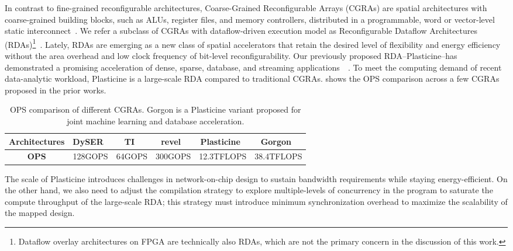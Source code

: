 In contrast to fine-grained reconfigurable architectures,
Coarse-Grained Reconfigurable Arrays (CGRAs) are spatial architectures with 
coarse-grained building blocks, such as ALUs, register files, and memory controllers, 
distributed in a programmable, word or vector-level static interconnect~\cite{adres, kress, dyser, piperench, tartan, 
hrl, hycube}.
We refer a subclass of CGRAs with dataflow-driven execution model as Reconfigurable Dataflow
Architectures (RDAs)\footnote{Dataflow overlay architectures on FPGA are technically also RDAs, which are not the primary concern in the discussion of this work.}~\cite{plasticine, ti, streamdataflow,neuflow,cnndataflow,dataflowarch}.
Lately, RDAs are emerging as a new class of spatial accelerators that retain the desired level of
flexibility and energy efficiency without the area overhead and low clock frequency of bit-level reconfigurability.
Our previously proposed RDA--Plasticine--has demonstrated a promising acceleration of dense, sparse, database, and streaming applications~~\cite{plasticine, gorgon, multijoin,prabhakarthesis}.
To meet the computing demand of recent data-analytic workload, Plasticine is a large-scale RDA
compared to traditional CGRAs. 
 shows the OPS comparison across a few CGRAs proposed in the prior works.

\begin{table}
  \centering
\begin{tabular*}{0.88\textwidth}{cccccc}
  \toprule
  \textbf{Architectures} & DySER~\cite{dyser} & TI~\cite{ti} & revel~\cite{revel}
  & Plasticine~\cite{plasticine} & Gorgon~\cite{gorgon}\\\midrule
  \textbf{OPS} & 128GOPS & 64GOPS & 300GOPS & 12.3TFLOPS & 38.4TFLOPS \\
  \bottomrule
\end{tabular*}
\caption[OPS comparison of different CGRAs]{OPS comparison of different CGRAs. Gorgon is a
Plasticine variant proposed for joint machine learning and database acceleration.}
\label{tab:ops}
\end{table}

The scale of Plasticine introduces challenges in network-on-chip design to sustain 
bandwidth requirements while staying energy-efficient.
On the other hand, we also need to adjust the compilation strategy to explore multiple-levels of
concurrency in the program to saturate the compute throughput of the large-scale RDA;
this strategy must introduce minimum synchronization overhead to maximize the scalability of the mapped design.

